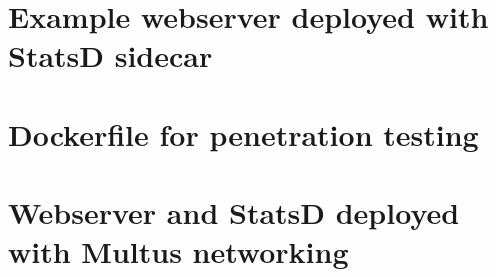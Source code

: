 \documentclass[english, 12pt, a4paper, sci, utf8, a-2b, online]{aaltothesis}
\begin{document}
\clearpage

\section{Example webserver deployed with StatsD sidecar} \label{app:node-webapp}



\clearpage





\clearpage

\section{Dockerfile for penetration testing} \label{app:iptables-injector}



\clearpage

\section{Webserver and StatsD deployed with Multus networking} \label{app:multus-sidecar}



\clearpage



\clearpage


\end{document}
